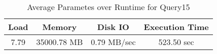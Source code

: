 \documentclass[../../main.tex]{subfiles}
\begin{document}
    \begin{table}
        \begin{center}
            \begin{tabular}{ |c|c|c|c| } 
            \hline
            Load & Memory & Disk IO & Execution Time\\
            \hline
            7.79 & 35000.78 MB & 0.79 MB/sec & 523.50 sec \\
            \hline
            \end{tabular}
            \\[1pt]
            \caption{Average Parametes over Runtime for Query15}
        \end{center}
    \end{table}
    \pagebreak
\end{document}
